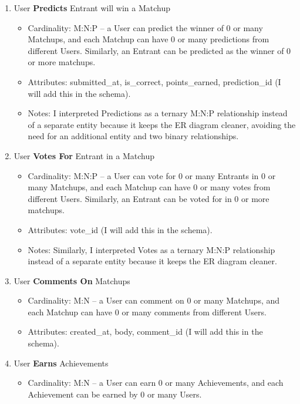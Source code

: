 \documentclass[11pt]{article}
\begin{document}
\begin{enumerate}
\begin{itemize}
        \end{itemize}
    \item User \textbf{Predicts} Entrant will win a Matchup
        \begin{itemize}
            \item Cardinality: M:N:P – a User can predict the winner of 0 or many Matchups, and each Matchup can have 0 or many predictions from different Users. Similarly, an Entrant can be predicted as the winner of 0 or more matchups.
            \item Attributes: submitted\_at, is\_correct, points\_earned, prediction\_id (I will add this in the schema).
            \item Notes: I interpreted Predictions as a ternary M:N:P relationship instead of a separate entity because it keeps the ER diagram cleaner, avoiding the need for an additional entity and two binary relationships.
        \end{itemize}
    \item User \textbf{Votes For} Entrant in a Matchup
        \begin{itemize}
            \item Cardinality: M:N:P – a User can vote for 0 or many Entrants in 0 or many Matchups, and each Matchup can have 0 or many votes from different Users. Similarly, an Entrant can be voted for in 0 or more matchups.
            \item Attributes: vote\_id (I will add this in the schema).
            \item Notes: Similarly, I interpreted Votes as a ternary M:N:P relationship instead of a separate entity because it keeps the ER diagram cleaner.
        \end{itemize}
    \item User \textbf{Comments On} Matchups
        \begin{itemize}
            \item Cardinality: M:N – a User can comment on 0 or many Matchups, and each Matchup can have 0 or many comments from different Users.
            \item Attributes: created\_at, body, comment\_id (I will add this in the schema).
        \end{itemize}
    \item User \textbf{Earns} Achievements
        \begin{itemize}
            \item Cardinality: M:N – a User can earn 0 or many Achievements, and each Achievement can be earned by 0 or many Users.

\end{itemize}
\end{enumerate}
\end{document}
